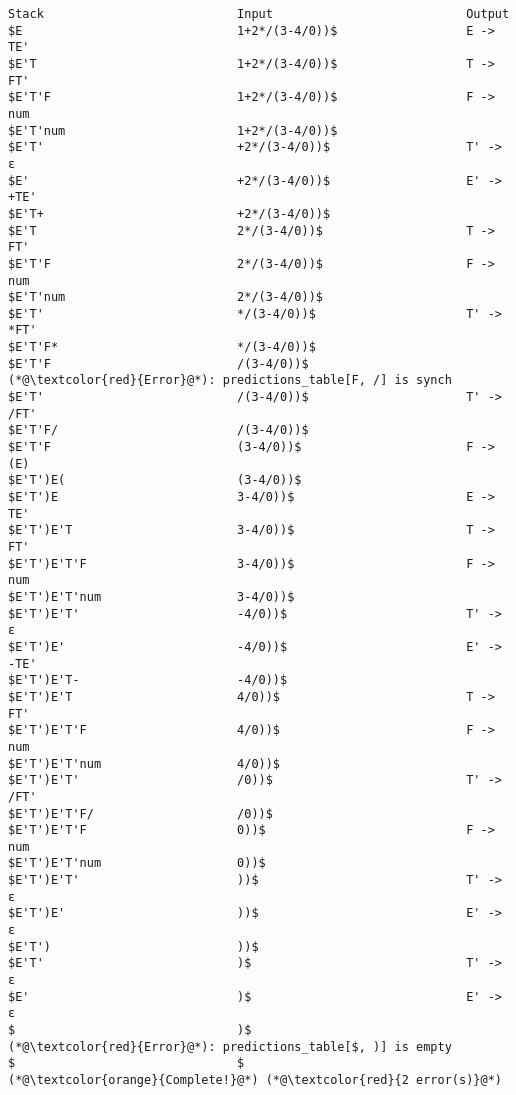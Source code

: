 \documentclass[lang=cn,11pt,a4paper]{elegantpaper}
\begin{document}
\begin{lstlisting}[language=text]
Stack                          	Input                          	Output
$E                             	1+2*/(3-4/0))$                	E -> TE'
$E'T                           	1+2*/(3-4/0))$                	T -> FT'
$E'T'F                         	1+2*/(3-4/0))$                	F -> num
$E'T'num                       	1+2*/(3-4/0))$                	
$E'T'                          	+2*/(3-4/0))$                 	T' -> ε
$E'                            	+2*/(3-4/0))$                 	E' -> +TE'
$E'T+                          	+2*/(3-4/0))$                 	
$E'T                           	2*/(3-4/0))$                  	T -> FT'
$E'T'F                         	2*/(3-4/0))$                  	F -> num
$E'T'num                       	2*/(3-4/0))$                  	
$E'T'                          	*/(3-4/0))$                   	T' -> *FT'
$E'T'F*                        	*/(3-4/0))$                   	
$E'T'F                         	/(3-4/0))$                    	(*@\textcolor{red}{Error}@*): predictions_table[F, /] is synch
$E'T'                          	/(3-4/0))$                    	T' -> /FT'
$E'T'F/                        	/(3-4/0))$                    	
$E'T'F                         	(3-4/0))$                     	F -> (E)
$E'T')E(                       	(3-4/0))$                     	
$E'T')E                        	3-4/0))$                      	E -> TE'
$E'T')E'T                      	3-4/0))$                      	T -> FT'
$E'T')E'T'F                    	3-4/0))$                      	F -> num
$E'T')E'T'num                  	3-4/0))$                      	
$E'T')E'T'                     	-4/0))$                       	T' -> ε
$E'T')E'                       	-4/0))$                       	E' -> -TE'
$E'T')E'T-                     	-4/0))$                       	
$E'T')E'T                      	4/0))$                        	T -> FT'
$E'T')E'T'F                    	4/0))$                        	F -> num
$E'T')E'T'num                  	4/0))$                        	
$E'T')E'T'                     	/0))$                         	T' -> /FT'
$E'T')E'T'F/                   	/0))$                         	
$E'T')E'T'F                    	0))$                          	F -> num
$E'T')E'T'num                  	0))$                          	
$E'T')E'T'                     	))$                           	T' -> ε
$E'T')E'                       	))$                           	E' -> ε
$E'T')                         	))$                           	
$E'T'                          	)$                            	T' -> ε
$E'                            	)$                            	E' -> ε
$                              	)$                            	(*@\textcolor{red}{Error}@*): predictions_table[$, )] is empty
$                              	$                             	
(*@\textcolor{orange}{Complete!}@*)	(*@\textcolor{red}{2 error(s)}@*)
\end{lstlisting}
\end{document}
